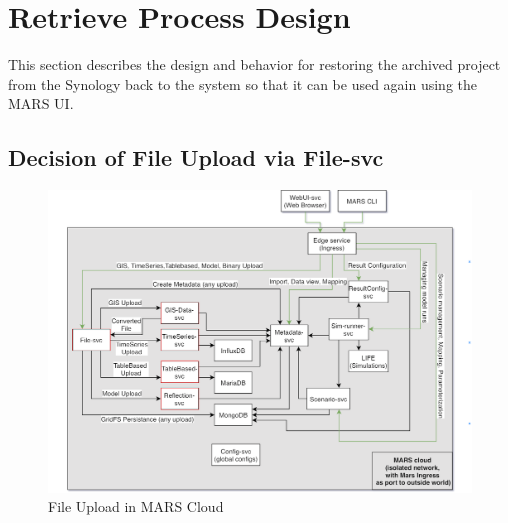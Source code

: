 \section{Retrieve Process Design}
This section describes the design and behavior for restoring the archived project from the Synology back to the system
so that it can be used again using the MARS UI.   

\subsection{Decision of File Upload via File-svc}
\label{ssec:file}

\begin{figure}[H]
    \centering \includegraphics[scale=0.4]{grafiken/mars-cloud.png}
    \caption{File Upload in MARS Cloud \cite{MARSCLoud}}
    \label{fig:MARSCloud}
\end{figure}

